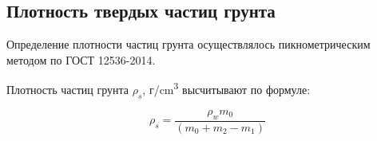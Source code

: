 

\subsection{Плотность твердых частиц грунта}

Определение плотности частиц грунта осуществлялось пикнометрическим методом по 
ГОСТ 12536-2014. 
%
%
%
%
%

Плотность частиц грунта $\rho_s$, г/\si{\centi\meter^3} высчитывают по формуле:

\[
   \rho_s = \frac{\rho_w m_0}{(m_0+m_2-m_1)}
\]


